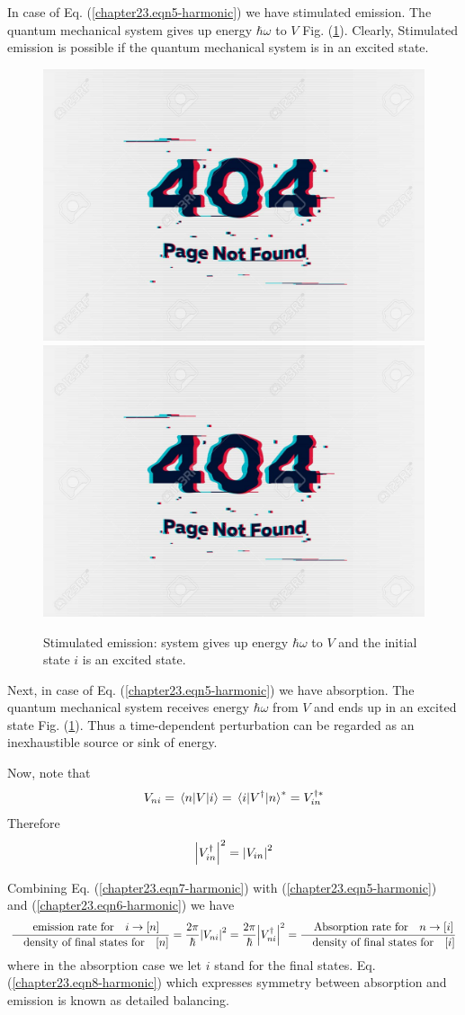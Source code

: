 In case of Eq. (\ref{chapter23.eqn5-harmonic}) we have stimulated emission. The quantum mechanical system gives up energy $\hbar\omega$ to $V$ Fig. (\ref{chapter23.fig3}). Clearly, Stimulated emission is possible if the quantum mechanical system is in an excited state.

\begin{figure}
	\centering
	\includegraphics[width=0.4\linewidth]{Pictures/not-found.jpg}
	\includegraphics[width=0.4\linewidth]{Pictures/not-found.jpg}
	\caption{Stimulated emission: system gives up energy $\hbar\omega$ to $V$ and the initial state $i$ is an excited state.}
	\label{chapter23.fig3}
\end{figure}


Next, 
in case of Eq. (\ref{chapter23.eqn5-harmonic}) we have absorption. The quantum mechanical system receives energy $\hbar\omega$ from $V$ and ends up in an excited state Fig. (\ref{chapter23.fig3}). Thus a time-dependent perturbation can be regarded as an inexhaustible source or sink of energy.


Now, note that
\begin{equation}
V_{n i} = \mel{n}{V}{i} = \mel{i}{V^\dagger}{n}^* = V_{i n}^{\dagger *}
\end{equation}
Therefore
\begin{equation}
\label{chapter23.eqn7-harmonic}
	\abs{V_{i n}^\dagger}^2 = \abs{V_{i n}}^2
\end{equation}

Combining Eq. (\ref{chapter23.eqn7-harmonic}) with (\ref{chapter23.eqn5-harmonic}) and (\ref{chapter23.eqn6-harmonic}) we have
\begin{equation}
\label{chapter23.eqn8-harmonic}
\frac{\qq{emission rate for} i \rightarrow [n]}{\qq{density of final states for} [n]} = \frac{2 \pi}{\hbar} \abs{V_{n i}}^2 = \frac{2 \pi}{\hbar} \abs{V_{n i}^\dagger}^2 = \frac{\qq{Absorption rate for} n \rightarrow [i]}{\qq{density of final states for} [i]}
\end{equation}
where in the absorption case we let $i$ stand for the final states. Eq. (\ref{chapter23.eqn8-harmonic}) which expresses symmetry between absorption and emission is known as detailed balancing.

